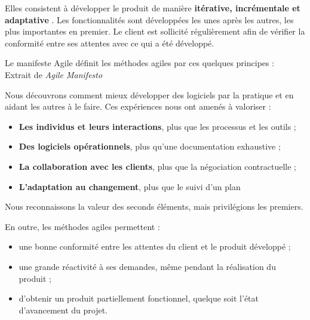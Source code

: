 
Elles consistent à développer le produit de manière \textbf{itérative, incrémentale et adaptative} . Les fonctionnalités sont développées les unes après les autres, les plus importantes en premier. Le client est sollicité régulièrement afin de vérifier la conformité entre ses attentes avec ce qui a été développé.

Le manifeste Agile  définit les méthodes agiles par ces quelques principes :\\

Extrait de \textit{Agile Manifesto}

\begin{Quote}
Nous découvrons comment mieux développer des logiciels par la pratique et en aidant les autres à le faire.
Ces expériences nous ont amenés à valoriser :

\begin{itemize}
\item \textbf{Les individus et leurs interactions}, plus que les processus et les outils ;
\item \textbf{Des logiciels opérationnels}, plus qu’une documentation exhaustive ;
\item \textbf{La collaboration avec les clients}, plus que la négociation contractuelle ;
\item \textbf{L’adaptation au changement}, plus que le suivi d’un plan
\end{itemize}

Nous reconnaissons la valeur des seconds éléments, mais privilégions les premiers.
\end{Quote}

En outre, les méthodes agiles permettent :

\begin{itemize}
\item une bonne conformité entre les attentes du client et le produit développé ;
\item une grande réactivité à ses demandes, même pendant la réalisation du produit ;
\item d'obtenir un produit partiellement fonctionnel, quelque soit l'état d'avancement du projet.
\end{itemize}

